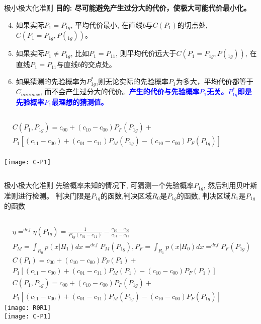 \begin{frame}[shrink]{极小极大化准则}
\textbf{目的: 尽可能避免产生过分大的代价，使极大可能代价最小化。}
\begin{enumerate}
\setcounter{enumi}{3}
\item 如果实际$P_1=P_{1g}$, 平均代价最小, 在直线$b$与$C(P_1)$的切点处, $C(P_1=P_{1g},P(_{1g}))$。
\item 如果实际$P_1\ne P_{1g}$, 比如$P_1=P_{11}$, 则平均代价远大于$C(P_1=P_{1g},P(_{1g}))$, 在直线$P_1=P_{11}$与直线$b$的交点处。
\item 如果猜测的先验概率为$P_{1g}^{\ast}$,则无论实际的先验概率$P_1$为多大，平均代价都等于$C_{minmax}$, 而不会产生过分大的代价。\textbf{\textcolor{blue}{产生的代价与先验概率$P_1$无关。$P_{1g}^{\ast}$即是先验概率$P_1$最理想的猜测值。}}
\end{enumerate}
\begin{columns}
\begin{align*}
&C(P_1,P_{1g})=c_{00}+(c_{10}-c_{00})P_F(P_{1g})+\\
&P_1[(c_{11}-c_{00})+(c_{01}-c_{11})P_M(P_{1g})-(c_{10}-c_{00})P_F(P_{1g})]
\end{align*}
~\\
\centering
\texttt{[image: C-P1]}
\end{columns}
\end{frame}

\begin{frame}[shrink]{极小极大化准则}
先验概率未知的情况下, 可猜测一个先验概率$P_{1g}$, 然后利用贝叶斯准则进行检测。
判决门限是$P_{1g}$的函数,判决区域$R_0$是$P_{1g}$的函数, 判决区域$R_1$是$P_{1g}$的函数
\begin{columns}
	\begin{align*}
	&\eta\mathop{=}^{def}\eta(P_{1g})=\frac{1}{P_{1g}(c_{01}-c_{11})}-\frac{c_{10}-c_{00}}{c_{01}-c_{11}}\\
	&P_M=\int_{R_0}p(x|H_1)dx\mathop{=}^{def}P_M(P_{1g}), P_F=\int_{R_1}p(x|H_0)dx\mathop{=}^{def}P_F(P_{1g})\\
	&C(P_1)=c_{00}+(c_{10}-c_{00})P_F(P_1)+\\
	&P_1[(c_{11}-c_{00})+(c_{01}-c_{11})P_M(P_1)-(c_{10}-c_{00})P_F(P_1)]\\
	&C(P_1,P_{1g})=c_{00}+(c_{10}-c_{00})P_F(P_{1g})+\\
	&P_1[(c_{11}-c_{00})+(c_{01}-c_{11})P_M(P_{1g})-(c_{10}-c_{00})P_F(P_{1g})]
	\end{align*}
	\centering
	\texttt{[image: R0R1]}\\
	\texttt{[image: C-P1]}
\end{columns}
\end{frame}






